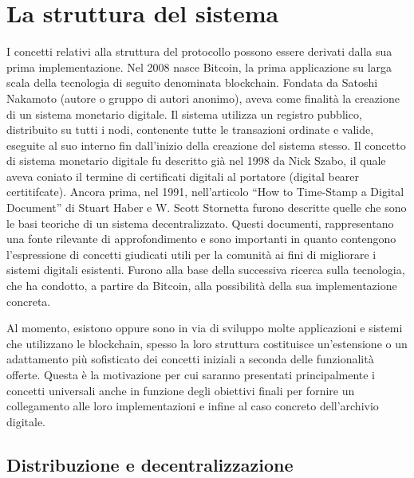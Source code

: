 \section{La struttura del sistema}

I concetti relativi alla struttura del protocollo possono essere derivati dalla sua prima implementazione. Nel 2008 nasce Bitcoin, la prima applicazione su larga scala della tecnologia di seguito denominata blockchain. Fondata da Satoshi Nakamoto (autore o gruppo di autori anonimo), aveva come finalità la creazione di un sistema monetario digitale. Il sistema utilizza un registro pubblico, distribuito su tutti i nodi, contenente tutte le transazioni ordinate e valide, eseguite al suo interno fin dall’inizio della creazione del sistema stesso. Il concetto di sistema monetario digitale fu descritto già nel 1998 da Nick Szabo, il quale aveva coniato il termine di certificati digitali al portatore (digital bearer certitifcate). Ancora prima, nel 1991, nell’articolo “How to Time-Stamp a Digital Document” di Stuart Haber e W. Scott Stornetta furono descritte quelle che sono le basi teoriche di un sistema decentralizzato. Questi documenti, rappresentano una fonte rilevante di approfondimento e sono importanti in quanto contengono l’espressione di concetti giudicati utili per la comunità ai fini di migliorare i sistemi digitali esistenti. Furono alla base della successiva ricerca sulla tecnologia, che ha condotto, a partire da Bitcoin, alla possibilità della sua implementazione concreta.

Al momento, esistono oppure sono in via di sviluppo molte applicazioni e sistemi che utilizzano le blockchain, spesso la loro struttura costituisce un’estensione o un adattamento più sofisticato dei concetti iniziali a seconda delle funzionalità offerte. Questa è la motivazione per cui saranno presentati principalmente i concetti universali anche in funzione degli obiettivi finali per fornire un collegamento alle loro implementazioni e infine al caso concreto dell’archivio digitale.

\subsection{Distribuzione e decentralizzazione}

